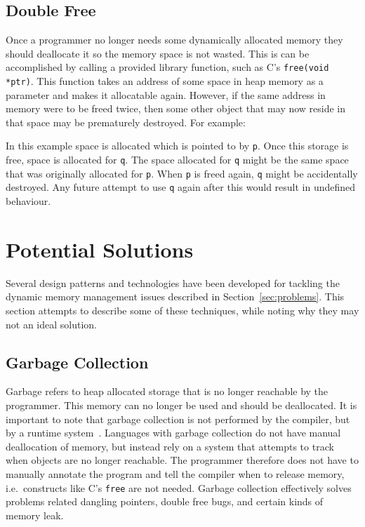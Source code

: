 \subsection{Double Free}\label{sec:doublefree}
Once a programmer no longer needs some dynamically allocated memory they should
deallocate it so the memory space is not wasted. This is can be accomplished by
calling a provided library function, such as C's \lstinline{free(void *ptr)}.
This function takes an address of some space in heap memory as a parameter and
makes it allocatable again. However, if the same address in memory were to be
freed twice, then some other object that may now reside in that space may be
prematurely destroyed. For example:



In this example space is allocated which is pointed to by \lstinline{p}. Once
this storage is free, space is allocated for \lstinline{q}. The space allocated
for \lstinline{q} might be the same space that was originally allocated for
\lstinline{p}.  When \lstinline{p} is freed again, \lstinline{q} might be
accidentally destroyed.  Any future attempt to use \lstinline{q} again after
this would result in undefined behaviour.

\section{Potential Solutions}
Several design patterns and technologies have been developed for tackling the
dynamic memory management issues described in Section~\ref{sec:problems}.  This
section attempts to describe some of these techniques, while noting why they
may not an ideal solution.

\subsection{Garbage Collection}
Garbage refers to heap allocated storage that is no longer reachable by the
programmer. This memory can no longer be used and should be deallocated. It is
important to note that garbage collection is not performed by the compiler, but
by a runtime system~\cite{appel}. Languages with garbage collection do not have
manual deallocation of memory, but instead rely on a system that attempts to
track when objects are no longer reachable.  The programmer therefore does not
have to manually annotate the program and tell the compiler when to release
memory, i.e.\ constructs like C's \lstinline{free} are not needed. Garbage
collection effectively solves problems related dangling pointers, double free
bugs, and certain kinds of memory leak.

